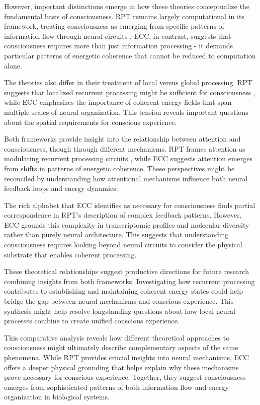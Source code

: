 However, important distinctions emerge in how these theories conceptualize the fundamental basis of consciousness. RPT remains largely computational in its framework, treating consciousness as emerging from specific patterns of information flow through neural circuits \cite{Dehaene2006}. ECC, in contrast, suggests that consciousness requires more than just information processing - it demands particular patterns of energetic coherence that cannot be reduced to computation alone.

The theories also differ in their treatment of local versus global processing. RPT suggests that localized recurrent processing might be sufficient for consciousness \cite{Super2001}, while ECC emphasizes the importance of coherent energy fields that span multiple scales of neural organization. This tension reveals important questions about the spatial requirements for conscious experience.

Both frameworks provide insight into the relationship between attention and consciousness, though through different mechanisms. RPT frames attention as modulating recurrent processing circuits \cite{Block2007}, while ECC suggests attention emerges from shifts in patterns of energetic coherence. These perspectives might be reconciled by understanding how attentional mechanisms influence both neural feedback loops and energy dynamics.

The rich alphabet that ECC identifies as necessary for consciousness finds partial correspondence in RPT's description of complex feedback patterns. However, ECC grounds this complexity in transcriptomic profiles and molecular diversity rather than purely neural architecture. This suggests that understanding consciousness requires looking beyond neural circuits to consider the physical substrate that enables coherent processing.

These theoretical relationships suggest productive directions for future research combining insights from both frameworks. Investigating how recurrent processing contributes to establishing and maintaining coherent energy states could help bridge the gap between neural mechanisms and conscious experience. This synthesis might help resolve longstanding questions about how local neural processes combine to create unified conscious experience.

This comparative analysis reveals how different theoretical approaches to consciousness might ultimately describe complementary aspects of the same phenomena. While RPT provides crucial insights into neural mechanisms, ECC offers a deeper physical grounding that helps explain why these mechanisms prove necessary for conscious experience. Together, they suggest consciousness emerges from sophisticated patterns of both information flow and energy organization in biological systems.

